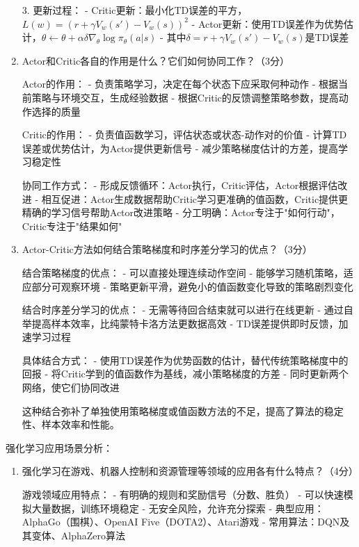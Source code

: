 \documentclass[zihao=5,answers]{BHCexam}
\begin{document}
\begin{questions}
\begin{solution}
\begin{enumerate}
    3. 更新过程：
       - Critic更新：最小化TD误差的平方，$L(w) = (r + \gamma V_w(s') - V_w(s))^2$
       - Actor更新：使用TD误差作为优势估计，$\theta \leftarrow \theta + \alpha \delta \nabla_\theta \log \pi_\theta(a|s)$
       - 其中$\delta = r + \gamma V_w(s') - V_w(s)$是TD误差
    
    \item Actor和Critic各自的作用是什么？它们如何协同工作？（3分）
    
    Actor的作用：
    - 负责策略学习，决定在每个状态下应采取何种动作
    - 根据当前策略与环境交互，生成经验数据
    - 根据Critic的反馈调整策略参数，提高动作选择的质量
    
    Critic的作用：
    - 负责值函数学习，评估状态或状态-动作对的价值
    - 计算TD误差或优势估计，为Actor提供更新信号
    - 减少策略梯度估计的方差，提高学习稳定性
    
    协同工作方式：
    - 形成反馈循环：Actor执行，Critic评估，Actor根据评估改进
    - 相互促进：Actor生成数据帮助Critic学习更准确的值函数，Critic提供更精确的学习信号帮助Actor改进策略
    - 分工明确：Actor专注于"如何行动"，Critic专注于"结果如何"
    
    \item Actor-Critic方法如何结合策略梯度和时序差分学习的优点？（3分）
    
    结合策略梯度的优点：
    - 可以直接处理连续动作空间
    - 能够学习随机策略，适应部分可观察环境
    - 策略更新平滑，避免小的值函数变化导致的策略剧烈变化
    
    结合时序差分学习的优点：
    - 无需等待回合结束就可以进行在线更新
    - 通过自举提高样本效率，比纯蒙特卡洛方法更数据高效
    - TD误差提供即时反馈，加速学习过程
    
    具体结合方式：
    - 使用TD误差作为优势函数的估计，替代传统策略梯度中的回报
    - 将Critic学到的值函数作为基线，减小策略梯度的方差
    - 同时更新两个网络，使它们协同改进
    
    这种结合弥补了单独使用策略梯度或值函数方法的不足，提高了算法的稳定性、样本效率和性能。
\end{enumerate}
\end{solution}

\question[10] 强化学习应用场景分析：
\begin{solution}
\begin{enumerate}
    \item 强化学习在游戏、机器人控制和资源管理等领域的应用各有什么特点？（4分）
    
    游戏领域应用特点：
    - 有明确的规则和奖励信号（分数、胜负）
    - 可以快速模拟大量数据，训练环境稳定
    - 无安全风险，允许充分探索
    - 典型应用：AlphaGo（围棋）、OpenAI Five（DOTA2）、Atari游戏
    - 常用算法：DQN及其变体、AlphaZero算法
    

\end{enumerate}
\end{solution}
\end{questions}
\end{document}
